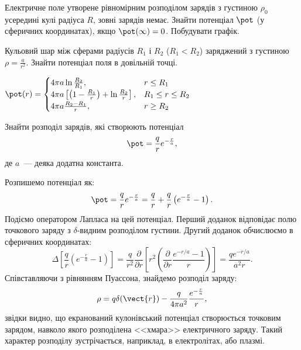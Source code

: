 
\begin{problem}
Електричне поле утворене рівномірним розподілом зарядів з густиною $\rho_0$ усередині кулі радіуса $R$, зовні зарядів немає. Знайти потенціал $\pot$ (у сферичних координатах), якщо  $\pot(\infty) = 0$. Побудувати графік.
\end{problem}

\begin{problem}
Кульовий шар між сферами радіусів $R_1$ і $R_2$ ($R_1 < R_2$) заряджений з густиною $\rho = \frac{a}{r^2}$. Знайти потенціал поля в довільній точці.
\begin{solution}
	$
		\pot(r) =
		\begin{cases}
			4\pi a\ln\frac{R_2}{R_1},                                                  & r \le R_1         \\
			4\pi a \left[ \left( 1- \frac{R_1}{r}\right)  + \ln\frac{R_2}{r} \right] , & R_1 \le r \le R_2 \\
			4\pi a \frac{R_2 - R_1}{r},                                                & r \ge R_2
		\end{cases}
	$
\end{solution}
\end{problem}

\begin{problem}
Знайти розподіл зарядів, які створюють  потенціал
\[
	\pot = \frac{q}{r}e^{-\frac{r}{a}},
\]
де $a$~--- деяка додатна константа.
\begin{solution}
	Розпишемо потенціал як:
    \[
	\pot = \frac{q}{r}e^{-\frac{r}{a}} = \frac{q}{r} +  \frac{q}{r}\left(e^{-\frac{r}{a}} - 1\right) .
    \]
    Подіємо оператором Лапласа на цей потенціал. Перший доданок відповідає полю точкового заряду з  $\delta$-видним розподілом густини. Другий доданок обчислюємо в сферичних координатах:
    \[
        \Delta \left[\frac{q}{r}\left(e^{-\frac{r}{a}} - 1\right) \right] =
    \frac{q}{r^2}\frac{\partial}{\partial r}\left[ r^2\left( \frac{\partial }{\partial r}\frac{e^{-r/a} - 1}{r} \right) \right] = \frac{qe^{-r/a}}{a^2r}.
    \]
	Співставляючи з рівнянням Пуассона, знайдемо розподіл заряду:
	\[
		\rho = q\delta(\vect{r}) - \frac{q}{4\pi a^2} \frac{e^{-\frac{r}{a}}}{r},
	\]
	звідки видно, що екранований кулонівський потенціал створюється точковим зарядом, навколо якого розподілена <<хмара>> електричного заряду. Такий характер розподілу зустрічається, наприклад, в електролітах, або плазмі.
\end{solution}
\end{problem}


